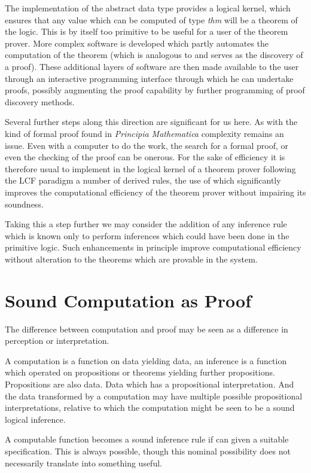 The implementation of the abstract data type provides a logical
kernel, which ensures that any value which can be computed of type
\emph{thm} will be a theorem of the logic.
This is by itself too primitive to be useful for a user of the theorem
prover.
More complex software is developed which partly automates the
computation of the theorem (which is analogous to and serves as the
discovery of a proof).
These additional layers of software are then made available to the
user through an interactive programming interface through which he can
undertake proofs, possibly augmenting the proof capability by further
programming of proof discovery methods.

Several further steps along this direction are significant for us
here.
As with the kind of formal proof found in \emph{Principia Mathematica}
complexity remains an issue.
Even with a computer to do the work, the search for a formal proof, or
even the checking of the proof can be onerous.
For the sake of efficiency it is therefore usual to implement in the
logical kernel of a theorem prover following the LCF paradigm a number
of derived rules, the use of which significantly improves the
computational efficiency of the theorem prover without impairing its
soundness. 

Taking this a step further we may consider the addition of any
inference rule which is known only to perform inferences which could
have been done in the primitive logic.
Such enhancements in principle improve computational efficiency
without alteration to the theorems which are provable in the system.

\section{Sound Computation as Proof}

The difference between computation and proof may be seen as a difference in
perception or interpretation.

A computation is a function on data yielding data, an inference is a
function which operated on propositions or theorems yielding further propositions.
Propositions are also data.
Data which has a propositional interpretation.
And the data transformed by a computation may have multiple possible
propositional interpretations, relative to which the computation might
be seen to be a sound logical inference.

A computable function becomes a sound inference rule if can given a
suitable specification.
This is always possible, though this nominal possibility does not
necessarily translate into something useful.

